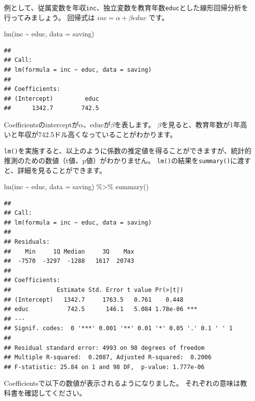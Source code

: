 \documentclass[
]{book}
\newenvironment{Shaded}{\begin{snugshade}}{\end{snugshade}}
\newcommand{\AttributeTok}[1]{\textcolor[rgb]{0.77,0.63,0.00}{#1}}
\newcommand{\FunctionTok}[1]{\textcolor[rgb]{0.00,0.00,0.00}{#1}}
\newcommand{\NormalTok}[1]{#1}
\newcommand{\SpecialCharTok}[1]{\textcolor[rgb]{0.00,0.00,0.00}{#1}}
\begin{document}
例として、従属変数を年収\texttt{inc}、独立変数を教育年数\texttt{educ}とした線形回帰分析を行ってみましょう。
回帰式は \(inc = \alpha + \beta educ\) です。

\begin{Shaded}
\begin{Highlighting}[]
\FunctionTok{lm}\NormalTok{(inc }\SpecialCharTok{\textasciitilde{}}\NormalTok{ educ, }\AttributeTok{data =}\NormalTok{ saving)}
\end{Highlighting}
\end{Shaded}

\begin{verbatim}
## 
## Call:
## lm(formula = inc ~ educ, data = saving)
## 
## Coefficients:
## (Intercept)         educ  
##      1342.7        742.5
\end{verbatim}

Coefficientsのinterceptが\(\alpha\)、educが\(\beta\)を表します。
\(\beta\)を見ると、教育年数が1年高いと年収が742.5ドル高くなっていることがわかります。

\texttt{lm()}を実施すると、以上のように係数の推定値を得ることができますが、統計的推測のための数値（t値、p値）がわかりません。
\texttt{lm()}の結果を\texttt{summary()}に渡すと、詳細を見ることができます。

\begin{Shaded}
\begin{Highlighting}[]
\FunctionTok{lm}\NormalTok{(inc }\SpecialCharTok{\textasciitilde{}}\NormalTok{ educ, }\AttributeTok{data =}\NormalTok{ saving) }\SpecialCharTok{\%\textgreater{}\%}
  \FunctionTok{summary}\NormalTok{()}
\end{Highlighting}
\end{Shaded}

\begin{verbatim}
## 
## Call:
## lm(formula = inc ~ educ, data = saving)
## 
## Residuals:
##    Min     1Q Median     3Q    Max 
##  -7570  -3297  -1288   1617  20743 
## 
## Coefficients:
##             Estimate Std. Error t value Pr(>|t|)    
## (Intercept)   1342.7     1763.5   0.761    0.448    
## educ           742.5      146.1   5.084 1.78e-06 ***
## ---
## Signif. codes:  0 '***' 0.001 '**' 0.01 '*' 0.05 '.' 0.1 ' ' 1
## 
## Residual standard error: 4993 on 98 degrees of freedom
## Multiple R-squared:  0.2087, Adjusted R-squared:  0.2006 
## F-statistic: 25.84 on 1 and 98 DF,  p-value: 1.777e-06
\end{verbatim}

Coefficientsで以下の数値が表示されるようになりました。
それぞれの意味は教科書を確認してください。
\end{document}

